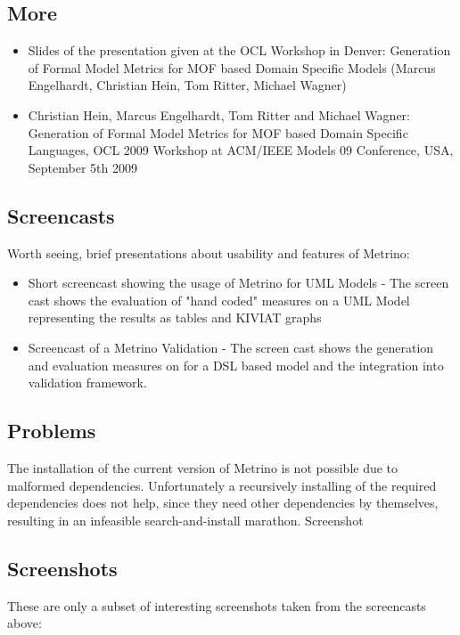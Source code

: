\subsection{More}
\begin{itemize}
\item Slides of the presentation given at the OCL Workshop in Denver: Generation of Formal Model Metrics for MOF based Domain Specific Models (Marcus Engelhardt, Christian Hein, Tom Ritter, Michael Wagner)
\item Christian Hein, Marcus Engelhardt, Tom Ritter and Michael Wagner: Generation of Formal Model Metrics for MOF based Domain Specific Languages, OCL 2009 Workshop at ACM/IEEE Models 09 Conference, USA, September 5th 2009
\end{itemize}

\subsection{Screencasts}
Worth seeing, brief presentations about usability and features of Metrino:

\begin{itemize}
\item Short screencast showing the usage of Metrino for UML Models - The screen cast shows the evaluation of "hand coded" measures on a UML Model representing the results as tables and KIVIAT graphs
\item Screencast of a Metrino Validation - The screen cast shows the generation and evaluation measures on for a DSL based model and the integration into validation framework.
\end{itemize}

\subsection{Problems}
The installation of the current version of Metrino is not possible due to malformed dependencies. Unfortunately a recursively installing of the required dependencies does not help, since they need other dependencies by themselves, resulting in an infeasible search-and-install marathon. Screenshot


\subsection{Screenshots}
These are only a subset of interesting screenshots taken from the screencasts above:


